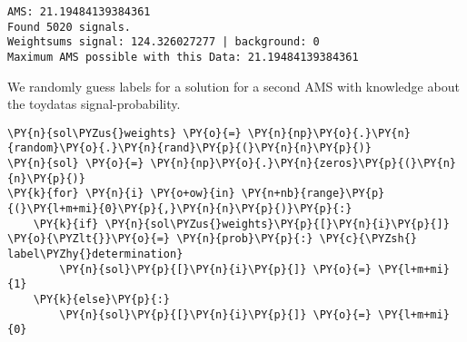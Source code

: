 \par\vspace{1\smallerfontscale}%
    \begin{addmargin}[\cellleftmargin]{0em}%
    {\smaller%
    \vspace{-1\smallerfontscale}%
    
    \begin{Verbatim}[commandchars=\\\{\}]
AMS: 21.19484139384361
Found 5020 signals.
Weightsums signal: 124.326027277 | background: 0
Maximum AMS possible with this Data: 21.19484139384361
    \end{Verbatim}
}%
    \end{addmargin}%
    We randomly guess labels for a solution for a second AMS with knowledge
about the toydatas signal-probability.


{\par%
\vspace{-1\baselineskip}%
}%
\begin{notebookcell}[]%
\begin{addmargin}[\cellleftmargin]{0em}%
{\smaller%
\par%
%
\vspace{-1\smallerfontscale}%
\begin{Verbatim}[commandchars=\\\{\}]
\PY{n}{sol\PYZus{}weights} \PY{o}{=} \PY{n}{np}\PY{o}{.}\PY{n}{random}\PY{o}{.}\PY{n}{rand}\PY{p}{(}\PY{n}{n}\PY{p}{)}
\PY{n}{sol} \PY{o}{=} \PY{n}{np}\PY{o}{.}\PY{n}{zeros}\PY{p}{(}\PY{n}{n}\PY{p}{)}
\PY{k}{for} \PY{n}{i} \PY{o+ow}{in} \PY{n+nb}{range}\PY{p}{(}\PY{l+m+mi}{0}\PY{p}{,}\PY{n}{n}\PY{p}{)}\PY{p}{:}
    \PY{k}{if} \PY{n}{sol\PYZus{}weights}\PY{p}{[}\PY{n}{i}\PY{p}{]} \PY{o}{\PYZlt{}}\PY{o}{=} \PY{n}{prob}\PY{p}{:} \PY{c}{\PYZsh{} label\PYZhy{}determination}
        \PY{n}{sol}\PY{p}{[}\PY{n}{i}\PY{p}{]} \PY{o}{=} \PY{l+m+mi}{1}
    \PY{k}{else}\PY{p}{:}
        \PY{n}{sol}\PY{p}{[}\PY{n}{i}\PY{p}{]} \PY{o}{=} \PY{l+m+mi}{0}
\end{Verbatim}
%
\par%
\vspace{-1\smallerfontscale}}%
\end{addmargin}
\end{notebookcell}


